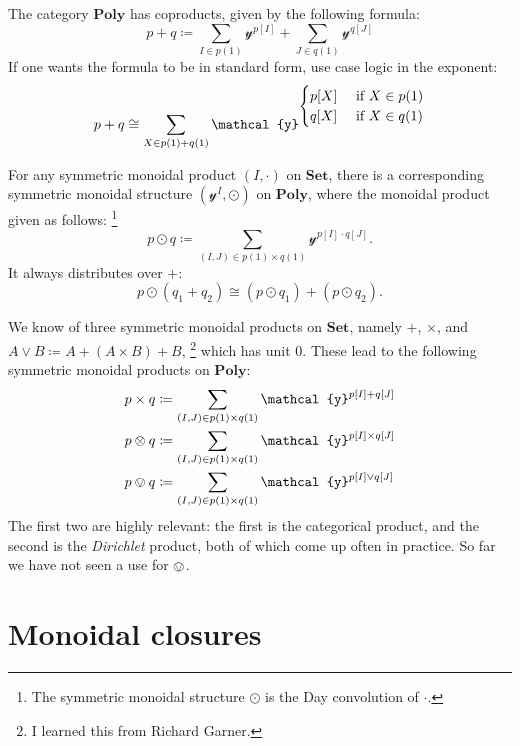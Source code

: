 \documentclass[11pt, one side, article]{memoir}
\theoremstyle{definition}
\theoremstyle{plain}
\newcommand{\Cat}[1]{\mathbf{#1}}%
\newcommand{\tn}[1]{\textnormal{#1}}
\newcommand{\smset}{\Cat{Set}}
\newcommand{\yon}{\mathcal{y}}
\newcommand{\poly}{\Cat{Poly}}
\newcommand{\0}{\textsf{0}}
\newcommand{\1}{\tn{\textsf{1}}}
\begin{document}
The category $\poly$ has coproducts, given by the following formula:
\begin{equation}
p+q\coloneqq\sum_{I\in p(1)}\yon^{p[I]}+\sum_{J\in q(1)}\yon^{q[J]}
\end{equation}
If one wants the formula to be in standard form, use case logic in the exponent:
\begin{equation}
p+q\cong\sum_{X\in p(1)+q(1)}\yon^{
	\begin{cases}
  	p[X]&\tn{ if }X\in p(1)\\
  	q[X]&\tn{ if }X\in q(1)
	\end{cases}
	}
\end{equation}

For any symmetric monoidal product $(I,\cdot)$ on $\smset$, there is a corresponding symmetric monoidal structure $(\yon^I,\odot)$ on $\poly$, where the monoidal product given as follows:%
\footnote{The symmetric monoidal structure $\odot$ is the Day convolution of $\cdot$.}
\begin{equation}
p\odot q\coloneqq\sum_{(I,J)\in p(1)\times q(1)}\yon^{p[I]\cdot q[J]}.
\end{equation}
It always distributes over $+$:
\begin{equation}
p\odot(q_1+q_2)\cong (p\odot q_1)+(p\odot q_2).
\end{equation}

We know of three symmetric monoidal products on $\smset$, namely $+$, $\times$, and $A\vee B\coloneqq A+(A\times B)+B$,%
\footnote{I learned this from Richard Garner.}
which has unit $0$. These lead to the following symmetric monoidal products on $\poly$:
\begin{align}
	p\times q&\coloneqq\sum_{(I,J)\in p(1)\times q(1)}\yon^{p[I]+ q[J]}\\
	p\otimes q&\coloneqq\sum_{(I,J)\in p(1)\times q(1)}\yon^{p[I]\times q[J]}\\
	p\ovee q&\coloneqq\sum_{(I,J)\in p(1)\times q(1)}\yon^{p[I]\vee q[J]}
\end{align}
The first two are highly relevant: the first is the categorical product, and the second is the \emph{Dirichlet} product, both of which come up often in practice. So far we have not seen a use for $\ovee$.

\chapter{Monoidal closures}
\end{document}

